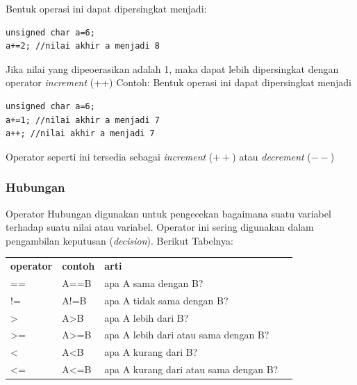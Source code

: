 \documentclass[12pt,]{article}
\begin{document}
	Bentuk operasi ini dapat dipersingkat menjadi:
	\begin{verbatim}
unsigned char a=6;
a+=2; //nilai akhir a menjadi 8
	\end{verbatim}

	Jika nilai yang dipeoerasikan adalah 1, maka dapat lebih dipersingkat dengan operator \textit{increment} (++)
	Contoh:
	Bentuk operasi ini dapat dipersingkat menjadi
	\begin{verbatim}
unsigned char a=6;
a+=1; //nilai akhir a menjadi 7
a++; //nilai akhir a menjadi 7
	\end{verbatim}

	Operator seperti ini tersedia sebagai \textit{increment} ($++$) atau \textit{decrement} ($--$)

	\subsubsection{Hubungan}

	Operator Hubungan digunakan untuk pengecekan bagaimana suatu variabel terhadap suatu nilai atau variabel.
	Operator ini sering digunakan dalam pengambilan keputusan (\textit{decision}).
	Berikut Tabelnya:
	\begin{table}[H]
		\begin{tabular}{|l|l|l|l}
			\cline{1-3}
			\textbf{operator} & \textbf{contoh} & \textbf{arti} \\ \cline{1-3}
			==                & A==B            & apa A sama dengan B? \\ \cline{1-3}
			!=                & A!=B            & apa A tidak sama dengan B? \\ \cline{1-3}
			>                 & A>B             & apa A lebih dari B?  \\ \cline{1-3}
			>=                & A>=B            & apa A lebih dari atau sama dengan B?\\ \cline{1-3}
			<                 & A<B             & apa A kurang dari B? \\ \cline{1-3}
			<=                & A<=B            & apa A kurang dari atau sama dengan B? \\ \cline{1-3}
		\end{tabular}
	\end{table}
\end{document}

